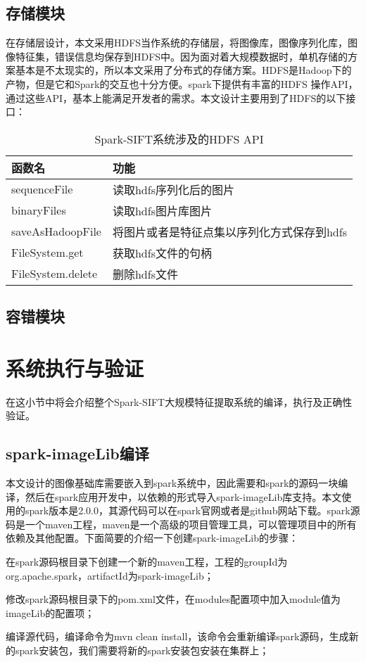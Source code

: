 \subsection{存储模块}
在存储层设计，本文采用HDFS当作系统的存储层，将图像库，图像序列化库，图像特征集，错误信息均保存到HDFS中。因为面对着大规模数据时，单机存储的方案基本是不太现实的，所以本文采用了分布式的存储方案。HDFS是Hadoop下的产物，但是它和Spark的交互也十分方便。spark下提供有丰富的HDFS 操作API，通过这些API，基本上能满足开发者的需求。本文设计主要用到了HDFS的以下接口：
\begin{table}[h] %
\caption{Spark-SIFT系统涉及的HDFS API} %
\centering
\label{tab:HDFS_API}
\begin{tabular}{p{3cm}|p{8cm}} %
\hline
\hline
函数名  &  功能 \\ %
\hline %
sequenceFile   & 读取hdfs序列化后的图片\\
\hline
binaryFiles   & 读取hdfs图片库图片\\
\hline
saveAsHadoopFile  & 将图片或者是特征点集以序列化方式保存到hdfs\\
\hline
FileSystem.get & 获取hdfs文件的句柄\\
\hline
FileSystem.delete & 删除hdfs文件\\
\hline
\hline
\end{tabular}
\end{table}
\subsection{容错模块}
\section{系统执行与验证}
在这小节中将会介绍整个Spark-SIFT大规模特征提取系统的编译，执行及正确性验证。
\subsection{spark-imageLib编译}
本文设计的图像基础库需要嵌入到spark系统中，因此需要和spark的源码一块编译，然后在spark应用开发中，以依赖的形式导入spark-imageLib库支持。本文使用的spark版本是2.0.0，其源代码可以在spark官网或者是github网站下载。spark源码是一个maven工程，maven是一个高级的项目管理工具，可以管理项目中的所有依赖及其他配置。下面简要的介绍一下创建spark-imageLib的步骤：
\begin{compactenum}
\item 在spark源码根目录下创建一个新的maven工程，工程的groupId为org.apache.spark，artifactId为spark-imageLib；
\item 修改spark源码根目录下的pom.xml文件，在modules配置项中加入module值为imageLib的配置项；
\item 编译源代码，编译命令为mvn clean install，该命令会重新编译spark源码，生成新的spark安装包，我们需要将新的spark安装包安装在集群上；
\end{compactenum}
